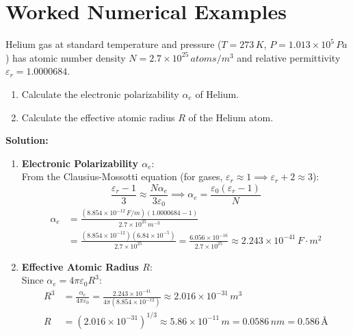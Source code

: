 \section{Worked Numerical Examples}

\begin{example}
Helium gas at standard temperature and pressure ($T = 273\,\si{K}$, $P = 1.013 \times 10^5\,\si{Pa}$) has atomic number density $N = 2.7 \times 10^{25}\,\si{atoms/m^3}$ and relative permittivity $\varepsilon_r = 1.0000684$.
\begin{enumerate}
    \item Calculate the electronic polarizability $\alpha_e$ of Helium.
    \item Calculate the effective atomic radius $R$ of the Helium atom.
\end{enumerate}

\textbf{Solution:}
\begin{enumerate}
    \item \textbf{Electronic Polarizability $\alpha_e$}:\\
    From the Clausius-Mossotti equation (for gases, $\varepsilon_r \approx 1 \implies \varepsilon_r + 2 \approx 3$):
    \begin{equation*}
        \frac{\varepsilon_r - 1}{3} \approx \frac{N\alpha_e}{3\varepsilon_0} \implies \alpha_e = \frac{\varepsilon_0(\varepsilon_r - 1)}{N}
    \end{equation*}
    \begin{align*}
        \alpha_e &= \frac{(8.854 \times 10^{-12}\,\si{F/m})(1.0000684 - 1)}{2.7 \times 10^{25}\,\si{m^{-3}}} \\
        &= \frac{(8.854 \times 10^{-12})(6.84 \times 10^{-5})}{2.7 \times 10^{25}} = \frac{6.056 \times 10^{-16}}{2.7 \times 10^{25}} \approx 2.243 \times 10^{-41}\,\si{F\cdot m^2}
    \end{align*}
    
    \item \textbf{Effective Atomic Radius $R$}:\\
    Since $\alpha_e = 4\pi\varepsilon_0 R^3$:
    \begin{align*}
        R^3 &= \frac{\alpha_e}{4\pi\varepsilon_0} = \frac{2.243 \times 10^{-41}}{4\pi (8.854 \times 10^{-12})} \approx 2.016 \times 10^{-31}\,\si{m^3} \\
        R &= (2.016 \times 10^{-31})^{1/3} \approx 5.86 \times 10^{-11}\,\si{m} = 0.0586\,\si{nm} = 0.586\,\si{\text{\AA}}
    \end{align*}
\end{enumerate}
\end{example}

